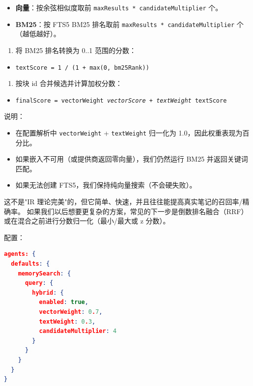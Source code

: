 \begin{itemize}
  \item \textbf{向量}：按余弦相似度取前 \texttt{maxResults * candidateMultiplier} 个。
  \item \textbf{BM25}：按 FTS5 BM25 排名取前 \texttt{maxResults * candidateMultiplier} 个（越低越好）。
\end{itemize}


\begin{enumerate}
  \item 将 BM25 排名转换为 0..1 范围的分数：
\end{enumerate}


\begin{itemize}
  \item \texttt{textScore = 1 / (1 + max(0, bm25Rank))}
\end{itemize}


\begin{enumerate}
  \item 按块 id 合并候选并计算加权分数：
\end{enumerate}


\begin{itemize}
  \item \texttt{finalScore = vectorWeight \textit{ vectorScore + textWeight } textScore}
\end{itemize}


说明：

\begin{itemize}
  \item 在配置解析中 \texttt{vectorWeight} + \texttt{textWeight} 归一化为 1.0，因此权重表现为百分比。
  \item 如果嵌入不可用（或提供商返回零向量），我们仍然运行 BM25 并返回关键词匹配。
  \item 如果无法创建 FTS5，我们保持纯向量搜索（不会硬失败）。
\end{itemize}


这不是"IR 理论完美"的，但它简单、快速，并且往往能提高真实笔记的召回率/精确率。
如果我们以后想要更复杂的方案，常见的下一步是倒数排名融合（RRF）或在混合之前进行分数归一化（最小/最大或 z 分数）。

配置：

\begin{lstlisting}[language=json]
agents: {
  defaults: {
    memorySearch: {
      query: {
        hybrid: {
          enabled: true,
          vectorWeight: 0.7,
          textWeight: 0.3,
          candidateMultiplier: 4
        }
      }
    }
  }
}
\end{lstlisting}


